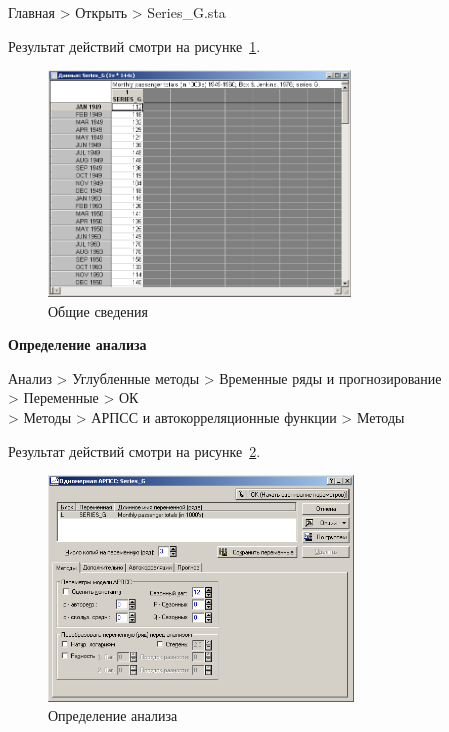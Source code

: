 Главная > Открыть > Series\_G.sta

Результат действий смотри на рисунке~\ref{fig:1}.

\begin{figure}[!h]
  \centering

  \includegraphics[height=6cm]
  {inc/Series_G/1.PNG}

  \caption{Общие сведения}

  \label{fig:1}
\end{figure}

\begin{center}
  \textbf{Определение анализа}
\end{center}

Анализ > Углубленные методы > Временные ряды и прогнозирование\\
> Переменные > ОК\\
> Методы > АРПСС и автокорреляционные функции > Методы

Результат действий смотри на рисунке~\ref{fig:2}.

\begin{figure}[!h]
  \centering

  \includegraphics[height=6cm]
  {inc/Series_G/2.PNG}

  \caption{Определение анализа}

  \label{fig:2}
\end{figure}

